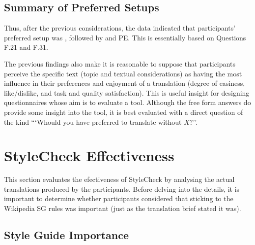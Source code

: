 \subsection{Summary of Preferred Setups}

\noindent Thus, after the previous considerations, the data indicated that participants' preferred setup was , followed by \style and \ac{PE}. This is essentially based on Questions F.21 and F.31.

The previous findings also make it is reasonable to suppose that participants perceive the specific text (topic and textual considerations) as having the most influence in their preferences and enjoyment of a translation (degree of easiness, like/dislike, and task and quality satisfaction). This is useful insight for designing questionnaires whose aim is to evaluate a tool. Although the free form answers do provide some insight into the tool, it is best evaluated with a direct question of the kind ```Whould you have preferred to translate without $X$?''.


\section{StyleCheck Effectiveness}
\label{sec:sc_effectiveness}

\noindent This section evaluates the efectiveness of StyleCheck by analysing the actual translations produced by the participants. Before delving into the details, it is important to determine whether participants considered that sticking to the Wikipedia \ac{SG} rules was important (just as the translation brief stated it was).

\subsection{Style Guide Importance}

